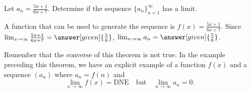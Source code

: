\documentclass{ximera}
\begin{document}
%
%





%
%
%

\begin{example}
Let $a_n = \frac{5n+1}{6n+7}$.  Determine if the sequence $\{a_n\}_{n=1}^{\infty}$ has a limit.

\begin{explanation}
A function that can be used to generate the sequence is $f(x) = \frac{5x+1}{6x+7}$.  Since $\lim_{x \to \infty} \frac{5x+1}{6x+7} = \answer[given]{\frac{5}{6}}$, $\lim_{n \to \infty} a_n = \answer[given]{\frac{5}{6}}$.
\end{explanation}

\end{example}

\begin{warning}
Remember that the converse of this theorem is not
true.  In the example preceding this theorem, we have an explicit example of a function $f(x)$ and a sequence $(a_n)$ where $a_n
=f(n)$ and
\[
\lim_{x\to\infty}f(x)=\text{DNE} \quad\text{but} \quad \lim_{n\to\infty} a_n = 0.
\]
\end{warning}
\end{document}
